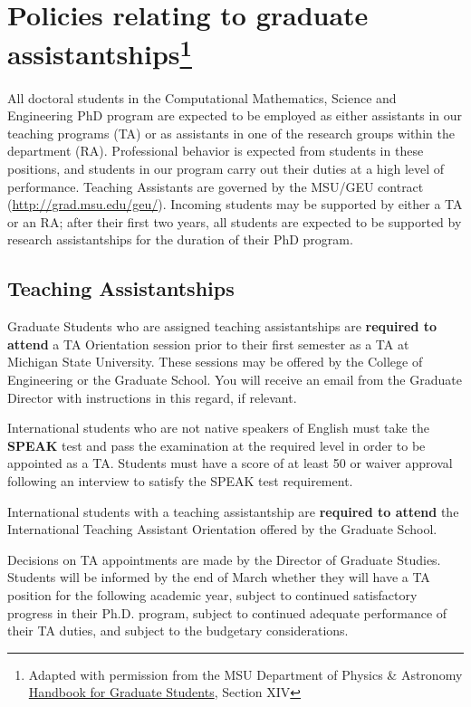 \section[Policies relating to graduate assistantships]{Policies
relating to graduate assistantships\footnote{Adapted with permission
from the MSU Department of Physics \& Astronomy
\href{https://www.pa.msu.edu/grad/GradHandbook_Aug2015.pdf}{Handbook
for Graduate Students}, Section XIV}}

All doctoral students in the Computational
Mathematics, Science and Engineering PhD program are expected to be
employed as either assistants in our teaching programs (TA) or as
assistants in one of the research groups within the department (RA).
Professional behavior is expected from students in these positions, and
students in our program carry out their duties at a high level of
performance.  Teaching Assistants are governed by the MSU/GEU contract
(\url{http://grad.msu.edu/geu/}).  Incoming students may be supported
by either a TA or an RA; after their first two years, all students are
expected to be supported by research assistantships for the duration
of their PhD program.

\subsection{Teaching Assistantships}

Graduate Students who are assigned teaching assistantships are
\textbf{required to attend} a TA Orientation session prior to their first
semester as a TA at Michigan State University.  These sessions may be
offered by the College of Engineering or the Graduate School.  You
will receive an email from the Graduate Director with instructions in
this regard, if relevant.

International students who are not native speakers of English must
take the \textbf{SPEAK} test and pass the examination at the required
level in order to be appointed as a TA.  Students must have a score of
at least 50 or waiver approval following an interview to satisfy the
SPEAK test requirement.

International students with a teaching assistantship are
\textbf{required to attend} the International Teaching Assistant
Orientation offered by the Graduate School.

Decisions on TA appointments are made by the Director of Graduate
Studies.  Students will be informed by the end of March whether they
will have a TA position for the following academic year, subject to
continued satisfactory progress in their Ph.D. program, subject to
continued adequate performance of their TA duties, and subject to the
budgetary considerations.

